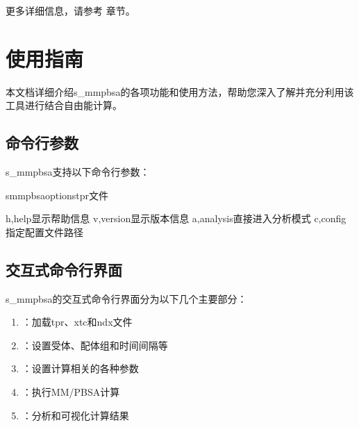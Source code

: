 \documentclass[letterpaper,10pt,english]{sphinxmanual}
\begin{document}
\sphinxAtStartPar
更多详细信息，请参考 {\hyperref[\detokenize{usage::doc}]{}} 章节。

\sphinxstepscope


\chapter{使用指南}
\label{\detokenize{usage:id1}}\label{\detokenize{usage::doc}}
\sphinxAtStartPar
本文档详细介绍s\_mmpbsa的各项功能和使用方法，帮助您深入了解并充分利用该工具进行结合自由能计算。


\section{命令行参数}
\label{\detokenize{usage:id2}}
\sphinxAtStartPar
s\_mmpbsa支持以下命令行参数：

\begin{sphinxVerbatim}[commandchars=\\\{\}]
s\PYGZus{}mmpbsa\PYG{o}{[}options\PYG{o}{]}\PYG{o}{[}tpr文件\PYG{o}{]}

\PYGZhy{}h,\PYGZhy{}\PYGZhy{}help显示帮助信息
\PYGZhy{}v,\PYGZhy{}\PYGZhy{}version显示版本信息
\PYGZhy{}a,\PYGZhy{}\PYGZhy{}analysis直接进入分析模式
\PYGZhy{}c,\PYGZhy{}\PYGZhy{}config指定配置文件路径
\end{sphinxVerbatim}


\section{交互式命令行界面}
\label{\detokenize{usage:id3}}
\sphinxAtStartPar
s\_mmpbsa的交互式命令行界面分为以下几个主要部分：
\begin{enumerate}
%
\item {} 
\sphinxAtStartPar
{}：加载tpr、xtc和ndx文件

\item {} 
\sphinxAtStartPar
{}：设置受体、配体组和时间间隔等

\item {} 
\sphinxAtStartPar
{}：设置计算相关的各种参数

\item {} 
\sphinxAtStartPar
{}：执行MM/PB\sphinxhyphen{}SA计算

\item {} 
\sphinxAtStartPar
{}：分析和可视化计算结果

\end{enumerate}
\end{document}
